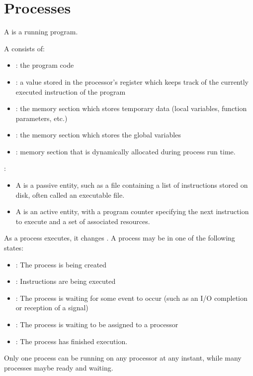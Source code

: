 \chapter{Processes}

    \par A  is a running program.
    \par A  consists of:
      \begin{itemize}
        \item {}: the program code
        \item {}: a value stored in the processor's register
          which keeps track of the currently executed instruction of the
          program
        \item {}: the memory section which stores temporary data (local
          variables, function parameters, etc.)
        \item {}: the memory section which stores the global
          variables
        \item {}: memory section that is dynamically allocated during
          process run time.
      \end{itemize}
    \par {}:
      \begin{itemize}
        \item A  is a passive entity, such as a file containing a
          list of instructions stored on disk, often called an executable file.
        \item A  is an active entity, with a program counter
          specifying the next instruction to execute and a set of associated
          resources.
      \end{itemize}

    \par As a process executes, it changes . A process may be in one
      of the following states:
      \begin{itemize}
        \item {}: The process is being created
        \item {}: Instructions are being executed
        \item {}: The process is waiting for some event to occur
          (such as an I/O completion or reception of a signal)
        \item {}: The process is waiting to be assigned to a processor
        \item {}: The process has finished execution.
      \end{itemize}
    \par  Only one process can be running on any processor at any instant, while many processes maybe ready and waiting.

